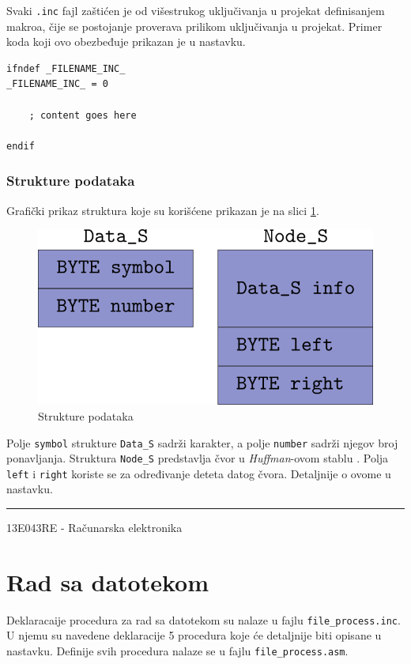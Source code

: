 \documentclass[a4paper, 12pt]{article}
\newcommand{\btmline}{
\vfill
\rule{0.9\textwidth}{0.4mm}
\begin{center}
13E043RE - Računarska elektronika
\end{center}}
\begin{document}
Svaki \verb|.inc| fajl zaštićen je od višestrukog uključivanja u projekat definisanjem makroa, čije se postojanje proverava prilikom uključivanja u projekat.
Primer koda koji ovo obezbeđuje prikazan je u nastavku.

\begin{verbatim}
ifndef _FILENAME_INC_
_FILENAME_INC_ = 0

	; content goes here
	
endif
\end{verbatim}

\subsubsection*{Strukture podataka}

Grafički prikaz struktura koje su korišćene prikazan je na slici \ref{struct}. 

\begin{figure}[h!]
\centering
\includegraphics[width=.5\textwidth]{structures}
\caption{Strukture podataka}
\label{struct}
\end{figure}

Polje \verb|symbol| strukture \verb|Data_S| sadrži karakter, a polje \verb|number| sadrži njegov broj ponavljanja.
Struktura \verb|Node_S| predstavlja čvor u \textit{Huffman}-ovom stablu . Polja \verb|left| i \verb|right| koriste se 
za određivanje deteta datog čvora. Detaljnije o ovome u nastavku.

\btmline\newpage

\section*{Rad sa datotekom}

Deklaracaije procedura za rad sa datotekom su nalaze u fajlu \verb|file_process.inc|. U njemu su navedene deklaracije 5 procedura koje će detaljnije biti opisane u nastavku. Definije svih procedura nalaze se u fajlu \verb|file_process.asm|.
\end{document}
